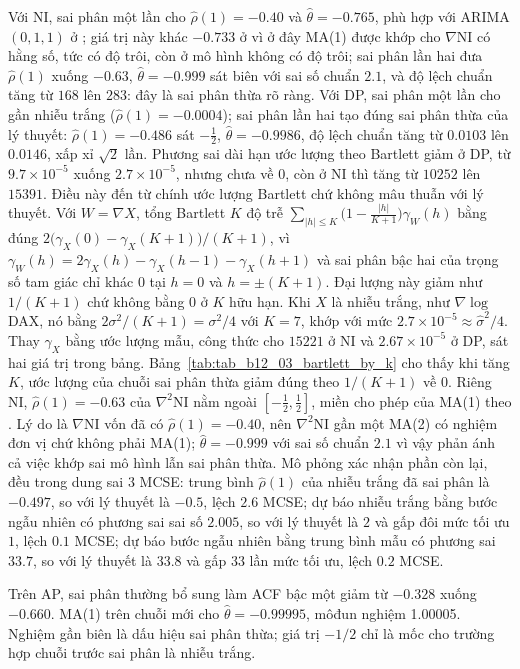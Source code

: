  Với NI, sai phân một lần cho $\hat\rho(1)=-0.40$ và $\hat\theta=-0.765$, phù hợp với ARIMA$(0,1,1)$ ở ; giá trị này khác $-0.733$ ở  vì ở đây MA(1) được khớp cho $\nabla$NI có hằng số, tức có độ trôi, còn ở  mô hình không có độ trôi; sai phân lần hai đưa $\hat\rho(1)$ xuống $-0.63$, $\hat\theta=-0.999$ sát biên với sai số chuẩn $2.1$, và độ lệch chuẩn tăng từ $168$ lên $283$: đây là sai phân thừa rõ ràng. Với DP, sai phân một lần cho gần nhiễu trắng ($\hat\rho(1)=-0.0004$); sai phân lần hai tạo đúng sai phân thừa của lý thuyết: $\hat\rho(1)=-0.486$ sát $-\tfrac12$, $\hat\theta=-0.9986$, độ lệch chuẩn tăng từ $0.0103$ lên $0.0146$, xấp xỉ $\sqrt2$ lần. Phương sai dài hạn ước lượng theo Bartlett giảm ở DP, từ $9.7\times10^{-5}$ xuống $2.7\times10^{-5}$, nhưng chưa về $0$, còn ở NI thì tăng từ $10252$ lên $15391$. Điều này đến từ chính ước lượng Bartlett chứ không mâu thuẫn với lý thuyết. Với $W=\nabla X$, tổng Bartlett $K$ độ trễ $\sum_{|h|\le K}\bigl(1-\tfrac{|h|}{K+1}\bigr)\gamma_W(h)$ bằng đúng $2\bigl(\gamma_X(0)-\gamma_X(K+1)\bigr)/(K+1)$, vì $\gamma_W(h)=2\gamma_X(h)-\gamma_X(h-1)-\gamma_X(h+1)$ và sai phân bậc hai của trọng số tam giác chỉ khác $0$ tại $h=0$ và $h=\pm(K+1)$. Đại lượng này giảm như $1/(K+1)$ chứ không bằng $0$ ở $K$ hữu hạn. Khi $X$ là nhiễu trắng, như $\nabla\log$ DAX, nó bằng $2\sigma^2/(K+1)=\sigma^2/4$ với $K=7$, khớp với mức $2.7\times10^{-5}\approx\hat\sigma^2/4$. Thay $\gamma_X$ bằng ước lượng mẫu, công thức cho $15221$ ở NI và $2.67\times10^{-5}$ ở DP, sát hai giá trị trong bảng. Bảng~\ref{tab:tab_b12_03_bartlett_by_k} cho thấy khi tăng $K$, ước lượng của chuỗi sai phân thừa giảm đúng theo $1/(K+1)$ về $0$. Riêng NI, $\hat\rho(1)=-0.63$ của $\nabla^2$NI nằm ngoài $[-\tfrac12,\tfrac12]$, miền cho phép của MA(1) theo . Lý do là $\nabla$NI vốn đã có $\hat\rho(1)=-0.40$, nên $\nabla^2$NI gần một MA(2) có nghiệm đơn vị chứ không phải MA(1); $\hat\theta=-0.999$ với sai số chuẩn $2.1$ vì vậy phản ánh cả việc khớp sai mô hình lẫn sai phân thừa. Mô phỏng xác nhận phần còn lại, đều trong dung sai $3$ MCSE: trung bình $\hat\rho(1)$ của nhiễu trắng đã sai phân là $-0.497$, so với lý thuyết là $-0.5$, lệch $2.6$ MCSE; dự báo nhiễu trắng bằng bước ngẫu nhiên có phương sai sai số $2.005$, so với lý thuyết là $2$ và gấp đôi mức tối ưu $1$, lệch $0.1$ MCSE; dự báo bước ngẫu nhiên bằng trung bình mẫu có phương sai $33.7$, so với lý thuyết là $33.8$ và gấp $33$ lần mức tối ưu, lệch $0.2$ MCSE.

Trên AP, sai phân thường bổ sung làm ACF bậc một giảm từ $-0.328$ xuống $-0.660$. MA(1) trên chuỗi mới cho $\hat\theta=-0.99995$, môđun nghiệm 1.00005. Nghiệm gần biên là dấu hiệu sai phân thừa; giá trị $-1/2$ chỉ là mốc cho trường hợp chuỗi trước sai phân là nhiễu trắng.

